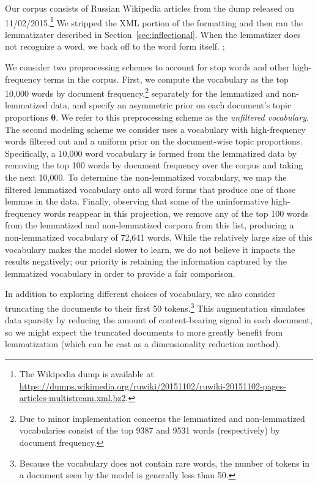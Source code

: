 \documentclass[11pt,letterpaper]{article}
\renewcommand{\vec}{\boldsymbol}   %
\newcommand{\vtheta}{{\vec{\theta}}}
\newcommand{\Note}[3]{\sethlcolor{#2}\hl{[\textbf{#1}: #3]}}
\renewcommand{\Note}[3]{}
\newcommand{\ryan}[1]{\Note{ryan}{lightorange}{#1}}
\newcommand{\chandler}[1]{\Note{chandler}{pink}{#1}}
\newcommand{\todo}[1]{\Note{todo}{red}{#1}}
\begin{document}
{Our corpus consists of Russian Wikipedia articles from the dump
released on 11/02/2015.\footnote{The Wikipedia dump is available at
    \url{https://dumps.wikimedia.org/ruwiki/20151102/ruwiki-20151102-pages-articles-multistream.xml.bz2}.
}
We stripped the XML portion of the formatting and then ran the
lemmatizater described in Section~\ref{sec:inflectional}.  When the
lemmatizer does not recognize a word, we back off to the word form
itself.
\todo{give num/frac unknown}; \ryan{How do we get this?}
\chandler{I'll do it (or remove this comment}

We consider two preprocessing schemes to account for stop words and
other high-frequency terms in the corpus.  First, we compute the
vocabulary as the top 10,000 words by document frequency,\footnote{
    Due to minor implementation concerns the lemmatized and
    non-lemmatized vocabularies consist of the top 9387 and 9531 words
    (respectively) by document frequency.
}
separately for the lemmatized and non-lemmatized data, and
specify an asymmetric prior on each document's topic proportions
$\vtheta$.
We refer to this preprocessing scheme
as the \emph{unfiltered vocabulary}.  The second modeling scheme we
consider uses a vocabulary with high-frequency words filtered out and a
uniform prior on the document-wise topic proportions.
Specifically, a 10,000 word vocabulary is formed from the
lemmatized data by removing the top 100 words by document frequency
over the corpus and taking the next 10,000.  To determine the
non-lemmatized vocabulary, we map the filtered lemmatized
vocabulary onto all word forms that produce one of those lemmas in
the data.  Finally, observing that some of the uninformative
high-frequency words reappear in this projection, we remove any
of the top 100 words from the lemmatized and non-lemmatized corpora
from this list, producing a non-lemmatized vocabulary of 72,641 words.
While the relatively large size of this vocabulary makes the model
slower to learn, we do not believe it impacts the results negatively;
our priority is retaining the information captured by the lemmatized
vocabulary in order to provide a fair comparison.

In addition to exploring different choices of vocabulary, we also
consider truncating the documents to their first 50 tokens.\footnote{
    Because the vocabulary does not contain rare words, the number of
    tokens in a document seen by the model is generally less than 50.
}
This augmentation simulates data sparsity by reducing the amount of
content-bearing signal in each document, so we might expect the
truncated documents to more greatly benefit from lemmatization (which
can be cast as a dimensionality reduction method).

}
\end{document}
